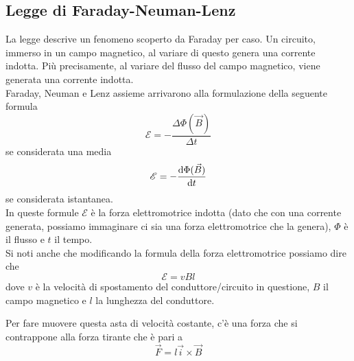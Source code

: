 \subsection{Legge di Faraday-Neuman-Lenz}\label{subsec:mag:fnl}
La legge descrive un fenomeno scoperto da Faraday per caso. Un circuito, immerso in un campo
magnetico, al variare di questo genera una corrente indotta. Più precisamente, al variare
del flusso del campo magnetico, viene generata una corrente indotta.\\
Faraday, Neuman e Lenz assieme arrivarono alla formulazione della seguente formula
\begin{equation*}
  \mathcal{E} = -\frac{\Delta\Phi(\vec{B})}{\Delta t}
\end{equation*}
se considerata una media
\begin{equation*}
  \mathcal{E} = -\frac{\mathop{}\!\mathrm{d}\Phi(\vec{B})}{\mathop{}\!\mathrm{d} t}
\end{equation*}
se considerata istantanea.\\
In queste formule $\mathcal{E}$ è la forza elettromotrice indotta (dato che con una corrente
generata, possiamo immaginare ci sia una forza elettromotrice che la genera), $\Phi$ è il flusso
e $t$ il tempo.\\
Si noti anche che modificando la formula della forza elettromotrice possiamo dire che
\begin{equation*}
  \mathcal{E} = vBl
\end{equation*}
dove $v$ è la velocità di spostamento del conduttore/circuito in questione, $B$ il campo magnetico
e $l$ la lunghezza del conduttore.
\begin{center}
\end{center}
Per fare muovere questa asta di velocità costante, c'è una forza che si contrappone alla forza
tirante che è pari a
\begin{equation*}
  \vec{F} = l\vec{i}\times\vec{B}
\end{equation*}

